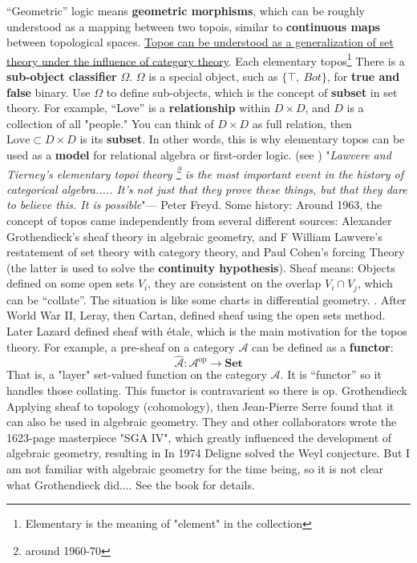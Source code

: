 \documentclass[12pt, orivec]{article}
\begin{document}
``Geometric'' logic means \textbf{geometric morphisms}, which can be roughly understood as a mapping between two topois, similar to \textbf{continuous maps} between topological spaces.
\uline{Topos can be understood as a generalization of set theory under the influence of category theory}. Each elementary topos\footnote{Elementary is the meaning of "element" in the collection} There is a \textbf{sub-object classifier} $\Omega$. $\Omega$ is a special object, such as $\{ \top, \ Bot \}$, for \textbf{true and false} binary. Use $\Omega$ to define sub-objects, which is the concept of \textbf{subset} in set theory. For example, ``Love'' is a \textbf{relationship} within $D \times D$, and $D$ is a collection of all "people." You can think of $D \times D$ as full relation, then $\mbox{Love} \subset D \times D$ is its \textbf{subset}. In other words, this is why elementary topos can be used as a \textbf{model} for relational algebra or first-order logic. (see \parencite{Goldblatt2006})
"\textit{Lawvere and Tierney's elementary topoi theory \footnote{around 1960-70} is the most important event in the history of categorical algebra..... It's not just that they prove these things, but that they dare to believe this. It is possible}"--- Peter Freyd.
Some history: Around 1963, the concept of topos came independently from several different sources: Alexander Grothendieck's sheaf theory in algebraic geometry, and F William Lawvere's restatement of set theory with category theory, and Paul Cohen's forcing Theory (the latter is used to solve the \textbf{continuity hypothesis}). Sheaf means: Objects defined on some open sets $V_i$, they are consistent on the overlap $V_i \cap V_j$, which can be ``collate''. The situation is like some charts in differential geometry. . After World War II, Leray, then Cartan, defined sheaf using the open sets method. Later Lazard defined sheaf with \'{e}tale, which is the main motivation for the topos theory. For example, a pre-sheaf on a category $\mathcal{A}$ can be defined as a \textbf{functor}:\begin{equation}
\widehat{\mathcal{A}}: \mathcal{A}^{\mathrm{op}} \rightarrow \mathbf{Set}
\end{equation}
That is, a "layer" set-valued function on the category $\mathcal{A}$. It is ``functor'' so it handles those collating. This functor is contravarient so there is $\mathrm{op}$. Grothendieck Applying sheaf to topology (cohomology), then Jean-Pierre Serre found that it can also be used in algebraic geometry. They and other collaborators wrote the 1623-page masterpiece "SGA IV", which greatly influenced the development of algebraic geometry, resulting in In 1974 Deligne solved the Weyl conjecture. But I am not familiar with algebraic geometry for the time being, so it is not clear what Grothendieck did.... See the book \parencite{MacLane1992} for details.
\end{document}
